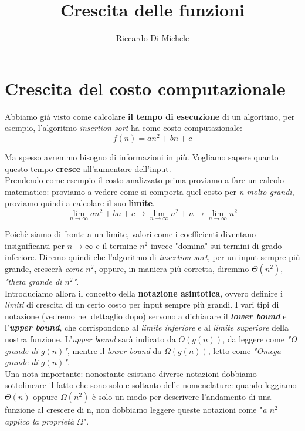 \documentclass[11pt]{article}
\title{Crescita delle funzioni}
\author{Riccardo Di Michele}
\begin{document}
\maketitle

\section*{Crescita del costo computazionale}
Abbiamo già visto come calcolare \textbf{il tempo di esecuzione} di un algoritmo, per esempio,
l'algoritmo \emph{insertion sort} ha come costo computazionale: 
\[ f(n) = an^2 +bn +c \]

Ma spesso avremmo bisogno di informazioni in più.
Vogliamo sapere quanto questo tempo \textbf{cresce} all'aumentare dell'input. \\
Prendendo come esempio il costo analizzato prima proviamo a fare un calcolo matematico:
proviamo a vedere come si comporta quel costo per \emph{n molto grandi}, proviamo quindi
a calcolare il suo \textbf{limite}.
\[
  \lim_{n \to \infty}{an^2 +bn +c} \longrightarrow 
  \lim_{n \to \infty}{n^2 + n} \longrightarrow 
  \lim_{n \to \infty}{n^2}
\]

Poichè siamo di fronte a un limite, valori come i coefficienti diventano insignificanti
per $n \to \infty$ e il termine $n^2$ invece "domina" sui termini di grado inferiore.
Diremo quindi che l'algoritmo di \emph{insertion sort}, per un input sempre più grande,
crescerà \emph{come} $n^2$, oppure, in maniera più corretta, diremmo $\Theta(n^2)$, 
\emph{"theta grande di $n^2$"}. \\
Introduciamo allora il concetto della \textbf{notazione asintotica},
ovvero definire i \emph{limiti} di crescita di un certo costo per input sempre
più grandi. I vari tipi di notazione (vedremo nel dettaglio dopo) servono a dichiarare
il \textbf{\emph{lower bound}} e l'\textbf{\emph{upper bound}}, che corrispondono al
\emph{limite inferiore} e al \emph{limite superiore} della nostra funzione.
L'\emph{upper bound} sarà indicato da $O(g(n))$, da leggere come \emph{"O grande di $g(n)$"}, mentre
il \emph{lower bound} da $\Omega(g(n))$, letto come \emph{"Omega grande di $g(n)$"}. \\
Una nota importante: nonostante esistano diverse notazioni dobbiamo sottolineare il fatto che
sono solo e soltanto delle \underline{nomenclature}: quando leggiamo $\Theta(n)$ oppure 
$\Omega(n^2)$ è solo un modo per descrivere l'andamento di una funzione al crescere di n,
non dobbiamo leggere queste notazioni come "\emph{a $n^2$ applico la proprietà $\Omega$}".
\end{document}
